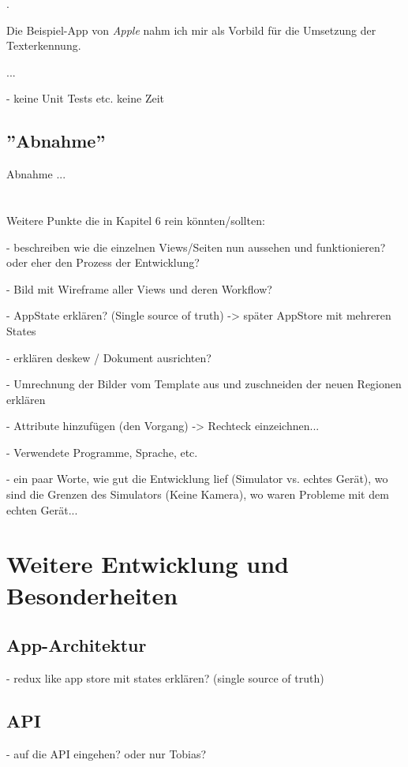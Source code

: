\documentclass[nomenclature, oneside, 150]{HSMW-Thesis}
\begin{document}
		.
		
		Die Beispiel-App von \textit{Apple} nahm ich mir als Vorbild für die Umsetzung der Texterkennung.
		
		...
		
		- keine Unit Tests etc. keine Zeit
		
	\section{''Abnahme''}	
		Abnahme ... \\ \\ \\
	
	
	Weitere Punkte die in Kapitel 6 rein könnten/sollten: 
	
	- beschreiben wie die einzelnen Views/Seiten nun aussehen und funktionieren? oder eher den Prozess der Entwicklung?
	
	- Bild mit Wireframe aller Views und deren Workflow?
	
	- AppState erklären? (Single source of truth) -> später AppStore mit mehreren States
	
	- erklären deskew / Dokument ausrichten?
	
	- Umrechnung der Bilder vom Template aus und zuschneiden der neuen Regionen erklären
	
	- Attribute hinzufügen (den Vorgang) -> Rechteck einzeichnen...
	
	- Verwendete Programme, Sprache, etc. 
	
	- ein paar Worte, wie gut die Entwicklung lief (Simulator vs. echtes Gerät), wo sind die Grenzen des Simulators (Keine Kamera), wo waren Probleme mit dem echten Gerät...


\chapter{Weitere Entwicklung und Besonderheiten}

	\section{App-Architektur}
		- redux like app store mit states erklären? (single source of truth)
	
	\section{API}
		- auf die API eingehen? oder nur Tobias?
	
\end{document}
